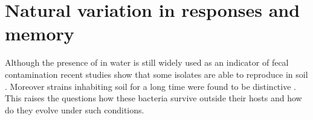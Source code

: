 \section{Natural variation in responses and memory}
Although the presence of  in water is still widely used as an indicator of fecal contamination recent studies show that some  isolates are able to  reproduce in soil \cite{byappanahalli2004indigenous, somorin2016general}.
Moreover strains inhabiting soil for a long time were found to be distinctive \cite{walk2009cryptic, walk2015cryptic}.
This raises the questions how these bacteria survive outside their hosts and how do they evolve under such conditions.


\cleardoublepage

